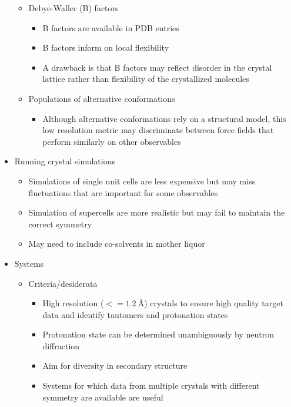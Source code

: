 \documentclass[9pt,review]{livecoms}
\begin{document}
\begin{itemize}
\begin{itemize}
	\item Debye-Waller (B) factors

		\begin{itemize}
		\item B factors are available in PDB entries
		\item B factors inform on local flexibility
		\item A drawback is that B factors may reflect disorder in the crystal lattice rather than flexibility of the crystallized molecules
		\end{itemize}
	
	\item Populations of alternative conformations

		\begin{itemize}
		\item Although alternative conformations rely on a structural model, this low resolution metric may discriminate between force fields that perform similarly on other observables
		\end{itemize}

	\end{itemize}

\item Running crystal simulations

	\begin{itemize}
	\item Simulations of single unit cells are less expensive but may miss fluctuations that are important for some observables
	\item Simulation of supercells are more realistic but may fail to maintain the correct symmetry
	\item May need to include co-solvents in mother liquor
	\end{itemize}

\item Systems

	\begin{itemize}

	\item Criteria/desiderata

		\begin{itemize}
		\item High resolution ($<= \SI{1.2}{\angstrom}$) crystals to ensure high quality target data and identify tautomers and protonation states
		\item Protonation state can be determined unambiguously by neutron diffraction
		\item Aim for diversity in secondary structure
		\item Systems for which data from multiple crystals with different symmetry are available are useful
		\end{itemize}


\end{itemize}
\end{itemize}
\end{document}
